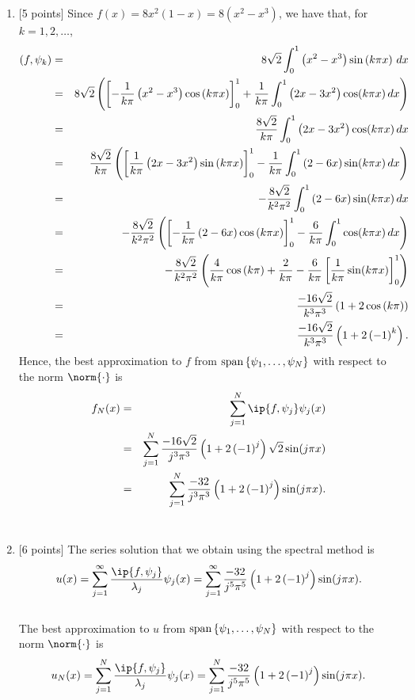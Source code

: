 \begin{solution}
\begin{enumerate}
\item {[5 points]} Since $f(x) = 8x^2(1-x) = 8\left(x^2-x^3\right)$, we have that, for $k=1,2,\ldots$,
\begin{eqnarray*}
(f,\psi_k)&=&8\sqrt{2}\int_0^1 \left(x^2-x^3\right) \sin\left(k\pi x\right)\, dx
\\
&=&8\sqrt{2}\left(\left[-{1\over k\pi}\left(x^2-x^3\right)\cos\left(k\pi x\right)\right]_0^1+{1\over k\pi}\int_0^1 \left(2x-3x^2\right) \cos(k\pi x)\, dx\right)
\\
&=&{8\sqrt{2}\over k\pi}\int_0^1 \left(2x-3x^2\right) \cos(k\pi x)\, dx
\\
&=&{8\sqrt{2}\over k\pi}\left(\left[{1\over k\pi}\left(2x-3x^2\right)\sin\left(k\pi x\right)\right]_0^1-{1\over k\pi}\int_0^1 \left(2-6x\right) \sin(k\pi x)\, dx\right)
\\
&=&-{8\sqrt{2}\over k^2\pi^2}\int_0^1 \left(2-6x\right) \sin(k\pi x)\, dx
\\
&=&-{8\sqrt{2}\over k^2\pi^2}\left(\left[-{1\over k\pi}\left(2-6x\right)\cos\left(k\pi x\right)\right]_0^1-{6\over k\pi}\int_0^1 \cos(k\pi x)\, dx\right)
\\
&=&-{8\sqrt{2}\over k^2\pi^2}\left({4\over k\pi}\cos\left(k\pi\right)+{2\over k\pi}-{6\over k\pi}\left[{1\over k\pi}\sin(k\pi x)\right]_0^1\right)
\\
&=&{-16\sqrt{2}\over k^3\pi^3}\left(1+2\cos\left(k\pi\right)\right)
\\
&=&{-16\sqrt{2}\over k^3\pi^3}\left(1+2\left(-1\right)^k\right).
\end{eqnarray*}
Hence, the best approximation to $f$ from ${\rm span}\left\{\psi_1,\ldots,\psi_N\right\}$ with respect to the norm $\norm{\cdot}$ is
\begin{eqnarray*}
f_N(x)&=&\sum_{j=1}^N\ip{f,\psi_j}\psi_j(x)
\\
&=&\sum_{j=1}^N{-16\sqrt{2}\over j^3\pi^3}\left(1+2\left(-1\right)^j\right)\sqrt{2}\sin(j\pi x)
\\
&=&\sum_{j=1}^N{-32\over j^3\pi^3}\left(1+2\left(-1\right)^j\right)\sin(j\pi x).
\end{eqnarray*}
\\
\item {[6 points]}  The series solution that we obtain using the spectral method is
\[
u(x)= \sum_{j=1}^\infty {\ip{f,\psi_j} \over \lambda_j}\psi_j(x)=\sum_{j=1}^\infty{-32\over j^5\pi^5}\left(1+2\left(-1\right)^j\right)\sin(j\pi x).
\]
\\
The best approximation to $u$ from ${\rm span}\left\{\psi_1,\ldots,\psi_N\right\}$ with respect to the norm $\norm{\cdot}$ is
\[
u_N(x)=\sum_{j=1}^N{\ip{f,\psi_j} \over \lambda_j}\psi_j(x)=\sum_{j=1}^N{-32\over j^5\pi^5}\left(1+2\left(-1\right)^j\right)\sin(j\pi x).
\]


\end{enumerate}
\end{solution}
